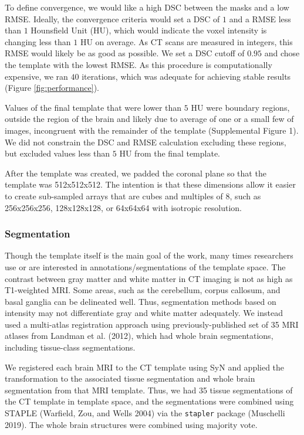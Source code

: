 \documentclass[]{elsarticle} %
\begin{document}
To define convergence, we would like a high DSC between the masks and a low RMSE. Ideally, the convergence criteria would set a DSC of \(1\) and a RMSE less than \(1\) Hounsfield Unit (HU), which would indicate the voxel intensity is changing less than \(1\) HU on average. As CT scans are measured in integers, this RMSE would likely be as good as possible. We set a DSC cutoff of \(0.95\) and chose the template with the lowest RMSE. As this procedure is computationally expensive, we ran \(40\) iterations, which was adequate for achieving stable results (Figure \ref{fig:performance}).

Values of the final template that were lower than \(5\) HU were boundary regions, outside the region of the brain and likely due to average of one or a small few of images, incongruent with the remainder of the template (Supplemental Figure 1). We did not constrain the DSC and RMSE calculation excluding these regions, but excluded values less than \(5\) HU from the final template.

After the template was created, we padded the coronal plane so that the template was 512x512x512. The intention is that these dimensions allow it easier to create sub-sampled arrays that are cubes and multiples of 8, such as 256x256x256, 128x128x128, or 64x64x64 with isotropic resolution.

\hypertarget{segmentation}{%
\subsubsection{Segmentation}\label{segmentation}}

Though the template itself is the main goal of the work, many times researchers use or are interested in annotations/segmentations of the template space. The contrast between gray matter and white matter in CT imaging is not as high as T1-weighted MRI. Some areas, such as the cerebellum, corpus callosum, and basal ganglia can be delineated well. Thus, segmentation methods based on intensity may not differentiate gray and white matter adequately. We instead used a multi-atlas registration approach using previously-published set of 35 MRI atlases from Landman et al. (2012), which had whole brain segmentations, including tissue-class segmentations.

We registered each brain MRI to the CT template using SyN and applied the transformation to the associated tissue segmentation and whole brain segmentation from that MRI template. Thus, we had 35 tissue segmentations of the CT template in template space, and the segmentations were combined using STAPLE (Warfield, Zou, and Wells 2004) via the \texttt{stapler} package (Muschelli 2019). The whole brain structures were combined using majority vote.
\end{document}
